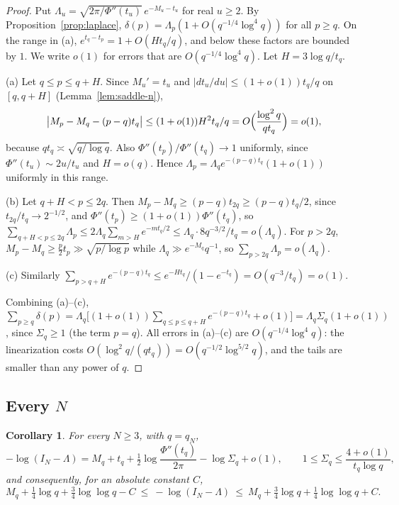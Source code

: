 \documentclass[11pt]{article}
\newtheorem{corollary}[theorem]{Corollary}
\theoremstyle{remark}
\begin{document}
\begin{proof}
Put $\Lambda_u=\sqrt{2\pi/\Phi''(t_u)}\,e^{-M_u-t_u}$ for real $u\ge2$. By
Proposition~\ref{prop:laplace}, $\delta(p)=\Lambda_p(1+O(q^{-1/4}\log^4q))$ for all $p\ge q$.
On the range in (a), $e^{t_q-t_p}=1+O(Ht_q/q)$, and below these factors are bounded by $1$.
We write $o(1)$ for errors that are $O(q^{-1/4}\log^4q)$.
Let $H=3\log q/t_q$.

(a) Let $q\le p\le q+H$. Since $M_u'=t_u$ and
$|dt_u/du|\le(1+o(1))t_q/q$ on $[q,q+H]$ (Lemma~\ref{lem:saddle-n}),
\[
\bigl|M_p-M_q-(p-q)t_q\bigr|\le(1+o(1))H^2t_q/q=O\Bigl(\frac{\log^2q}{qt_q}\Bigr)=o(1),
\]
because $qt_q\asymp\sqrt{q/\log q}$. Also $\Phi''(t_p)/\Phi''(t_q)\to1$ uniformly, since
$\Phi''(t_u)\sim2u/t_u$ and $H=o(q)$. Hence $\Lambda_p=\Lambda_qe^{-(p-q)t_q}(1+o(1))$ uniformly in
this range.

(b) Let $q+H<p\le2q$. Then $M_p-M_q\ge(p-q)t_{2q}\ge(p-q)t_q/2$, since $t_{2q}/t_q\to2^{-1/2}$, and
$\Phi''(t_p)\ge(1+o(1))\Phi''(t_q)$, so
$\sum_{q+H<p\le2q}\Lambda_p\le2\Lambda_q\sum_{m>H}e^{-mt_q/2}\le\Lambda_q\cdot8q^{-3/2}/t_q=o(\Lambda_q)$.
For $p>2q$, $M_p-M_q\ge\frac p2t_p\gg\sqrt{p/\log p}$ while
$\Lambda_q\gg e^{-M_q}q^{-1}$, so $\sum_{p>2q}\Lambda_p=o(\Lambda_q)$.

(c) Similarly $\sum_{p>q+H}e^{-(p-q)t_q}\le e^{-Ht_q}/(1-e^{-t_q})=O(q^{-3}/t_q)=o(1)$.

Combining (a)--(c),
$\sum_{p\ge q}\delta(p)=\Lambda_q\bigl[(1+o(1))\sum_{q\le p\le q+H}e^{-(p-q)t_q}+o(1)\bigr]
=\Lambda_q\Sigma_q(1+o(1))$, since $\Sigma_q\ge1$ (the term $p=q$). All errors in (a)--(c) are
$O(q^{-1/4}\log^4q)$: the linearization costs $O(\log^2q/(qt_q))=O(q^{-1/2}\log^{5/2}q)$, and the
tails are smaller than any power of $q$.
\end{proof}

\subsection{Every \texorpdfstring{$N$}{N}}

\begin{corollary}\label{cor:every}
For every $N\ge3$, with $q=q_N$,
\[
-\log(I_N-\Lambda)=M_q+t_q+\tfrac12\log\frac{\Phi''(t_q)}{2\pi}-\log\Sigma_q+o(1),
\qquad 1\le\Sigma_q\le\frac{4+o(1)}{t_q\log q} ,
\]
and consequently, for an absolute constant $C$,
\[
M_q+\tfrac14\log q+\tfrac34\log\log q-C\ \le\ -\log(I_N-\Lambda)\ \le\
M_q+\tfrac34\log q+\tfrac14\log\log q+C .
\]
\end{corollary}
\end{document}
